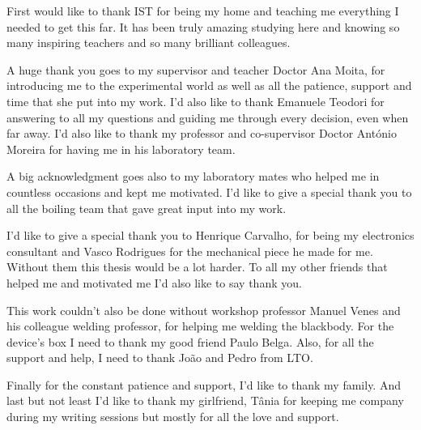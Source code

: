 \thispagestyle{empty}

\begin{acknowledgments} 

First would like to thank IST for being my home and teaching me everything I needed to get this far. It has been truly amazing studying here and knowing so many inspiring teachers and so many brilliant colleagues.\\
\par A huge thank you goes to my supervisor and teacher Doctor Ana Moita, for introducing me to the experimental world as well as all the patience, support and time that she put into my work. I'd also like to thank Emanuele Teodori for answering to all my questions and guiding me through every decision, even when far away. I'd also like to thank my professor and co-supervisor Doctor António Moreira for having me in his laboratory team.\\
\par A big acknowledgment goes also to my laboratory mates who helped me in countless occasions and kept me motivated. I'd like to give a special thank you to all the boiling team that gave great input into my work.\\
\par I'd like to give a special thank you to Henrique Carvalho, for being my electronics consultant and Vasco Rodrigues for the mechanical piece he made for me. Without them this thesis would be a lot harder. To all my other friends that helped me and motivated me I'd also like to say thank you.\\
\par This work couldn't also be done without workshop professor Manuel Venes and his colleague welding professor, for helping me welding the blackbody. For the device's box I need to thank my good friend Paulo Belga. Also, for all the support and help, I need to thank João and Pedro from LTO.\\
\par Finally for the constant patience and support, I'd like to thank my family. And last but not least I'd like to thank my girlfriend, Tânia for keeping me company during my writing sessions but mostly for all the love and support.

\end{acknowledgments}


\clearpage
\thispagestyle{empty}
\cleardoublepage